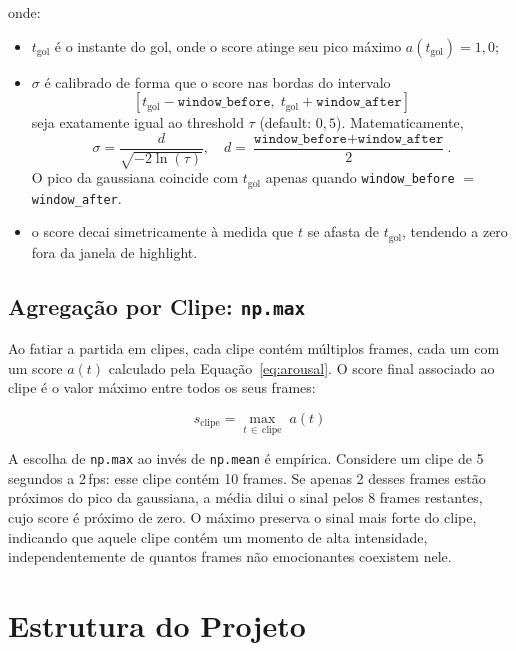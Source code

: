 \documentclass[12pt, a4paper]{article}
\begin{document}
\noindent onde:
\begin{itemize}
    \item $t_{\text{gol}}$ é o instante do gol, onde o score atinge seu pico máximo $a(t_{\text{gol}}) = 1{,}0$;
    \item $\sigma$ é calibrado de forma que o score nas bordas do intervalo
    \[
        \left[t_{\text{gol}} - \texttt{window\_before},\;
        t_{\text{gol}} + \texttt{window\_after}\right]
    \]
    seja exatamente igual ao threshold $\tau$ (default: $0{,}5$). Matematicamente,
    \[
        \sigma = \frac{d}{\sqrt{-2\ln(\tau)}}, \quad
        d = \frac{\texttt{window\_before} + \texttt{window\_after}}{2}.
    \]
    O pico da gaussiana coincide com $t_{\text{gol}}$ apenas quando
    \texttt{window\_before} $=$ \texttt{window\_after}.

    \item o score decai simetricamente à medida que $t$ se afasta de $t_{\text{gol}}$, tendendo a zero fora da janela de highlight.
\end{itemize}

\subsection{Agregação por Clipe: \texttt{np.max}}

Ao fatiar a partida em clipes, cada clipe contém múltiplos frames, cada um com um score $a(t)$ calculado pela Equação~\ref{eq:arousal}. O score final associado ao clipe é o valor máximo entre todos os seus frames:

\begin{equation}
    s_{\text{clipe}} = \max_{t \,\in\, \text{clipe}}\; a(t)
\end{equation}

A escolha de \texttt{np.max} ao invés de \texttt{np.mean} é empírica. Considere um clipe de 5 segundos a 2\,fps: esse clipe contém 10 frames. Se apenas 2 desses frames estão próximos do pico da gaussiana, a média dilui o sinal pelos 8 frames restantes, cujo score é próximo de zero. O máximo preserva o sinal mais forte do clipe, indicando que aquele clipe contém um momento de alta intensidade, independentemente de quantos frames não emocionantes coexistem nele.

\newpage

\section{Estrutura do Projeto}
\end{document}
